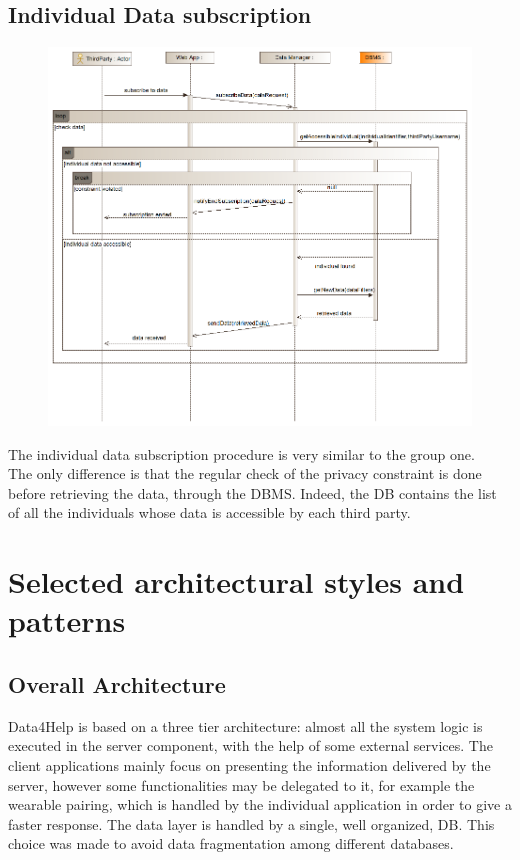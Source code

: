 \subsection{Individual Data subscription}
\begin{figure}[H]
\centering
\includegraphics[width=\linewidth]{resources/uml/sequence/IndividualDataSubscription.png}
\end{figure}
The individual data subscription procedure is very similar to the group one.\\
The only difference is that the regular check of the privacy constraint is done before retrieving the data, through the DBMS. Indeed, the DB contains the list of all the individuals whose data is accessible by each third party.\\ 


\section{Selected architectural styles and patterns}
\subsection{Overall Architecture}
Data4Help is based on a three tier architecture: almost all the system logic is executed in the server component, with the help of some external services.
The client applications mainly focus on presenting the information delivered by the server, however some functionalities may be delegated to it, for example the wearable pairing, which is handled by the individual application in order to give a faster response.
The data layer is handled by a single, well organized, DB. This choice was made to avoid data fragmentation among different databases.
\\

